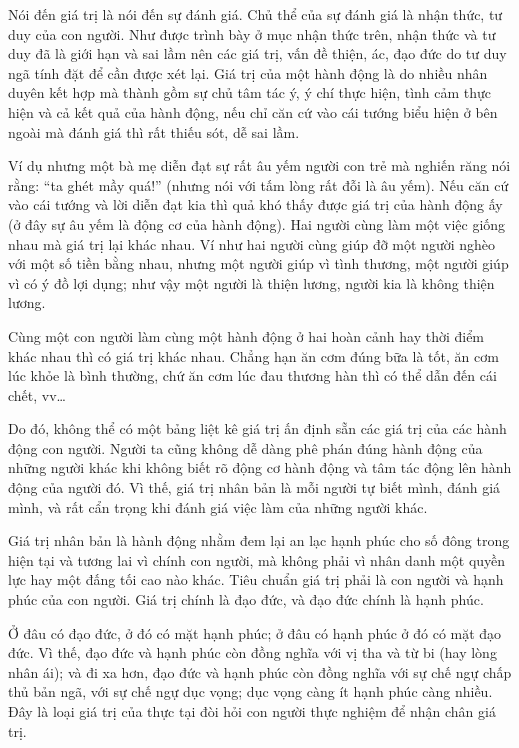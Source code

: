 Nói đến giá trị là nói đến sự đánh giá. Chủ thể của sự đánh giá là nhận thức, tư duy của con người. Như được trình bày ở mục nhận thức trên, nhận thức và tư duy đã là giới hạn và sai lầm nên các giá trị, vấn đề thiện, ác, đạo đức do tư duy ngã tính đặt để cần được xét lại. Giá trị của một hành động là do nhiều nhân duyên kết hợp mà thành gồm sự chủ tâm tác ý, ý chí thực hiện, tình cảm thực hiện và cả kết quả của hành động, nếu chỉ căn cứ vào cái tướng biểu hiện ở bên ngoài mà đánh giá thì rất thiếu sót, dễ sai lầm.

Ví dụ nhưng một bà mẹ diễn đạt sự rất âu yếm người con trẻ mà nghiến răng nói rằng: ``ta ghét mầy quá!'' (nhưng nói với tấm lòng rất đỗi là âu yếm). Nếu căn cứ vào cái tướng và lời diễn đạt kia thì quả khó thấy được giá trị của hành động ấy (ở đây sự âu yếm là động cơ của hành động). Hai người cùng làm một việc giống nhau mà giá trị lại khác nhau. Ví như hai người cùng giúp đỡ một người nghèo với một số tiền bằng nhau, nhưng một người giúp vì tình thương, một người giúp vì có ý đồ lợi dụng; như vậy một người là thiện lương, người kia là không thiện lương.

Cùng một con người làm cùng một hành động ở hai hoàn cảnh hay thời điểm khác nhau thì có giá trị khác nhau. Chẳng hạn ăn cơm đúng bữa là tốt, ăn cơm lúc khỏe là bình thường, chứ ăn cơm lúc đau thương hàn thì có thể dẫn đến cái chết, vv\ldots

Do đó, không thể có một bảng liệt kê giá trị ấn định sẵn các giá trị của các hành động con người. Người ta cũng không dễ dàng phê phán đúng hành động của những người khác khi không biết rõ động cơ hành động và tâm tác động lên hành động của người đó. Vì thế, giá trị nhân bản là mỗi người tự biết mình, đánh giá mình, và rất cẩn trọng khi đánh giá việc làm của những người khác.

Giá trị nhân bản là hành động nhằm đem lại an lạc hạnh phúc cho số đông trong hiện tại và tương lai vì chính con người, mà không phải vì nhân danh một quyền lực hay một đấng tối cao nào khác. Tiêu chuẩn giá trị phải là con người và hạnh phúc của con người. Giá trị chính là đạo đức, và đạo đức chính là hạnh phúc.

Ở đâu có đạo đức, ở đó có mặt hạnh phúc; ở đâu có hạnh phúc ở đó có mặt đạo đức. Vì thế, đạo đức và hạnh phúc còn đồng nghĩa với vị tha và từ bi (hay lòng nhân ái); và đi xa hơn, đạo đức và hạnh phúc còn đồng nghĩa với sự chế ngự chấp thủ bản ngã, với sự chế ngự dục vọng; dục vọng càng ít hạnh phúc càng nhiều. Đây là loại giá trị của thực tại đòi hỏi con người thực nghiệm để nhận chân giá trị.

